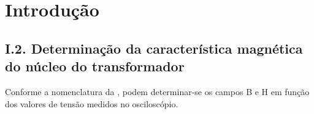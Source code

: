 \documentclass[%
  reprint,
  nofootinbib,
  amsmath,amssymb,
  aps,
  10pt,
]{revtex4-1}
\begin{document}


 

\title{}

\author{Pedro Ribeiro}%
\author{Luis Macedo}%
\author{Samuel Balula}%



\date{\today}

\begin{abstract}

\end{abstract}
\maketitle


\section{Introdução}
\label{s:intro}
\subsection*{I.2. Determinação da característica magnética do núcleo do transformador}
Conforme a nomenclatura da , podem determinar-se os campos B e H em função dos valores de tensão medidos no osciloscópio.
\end{document}
